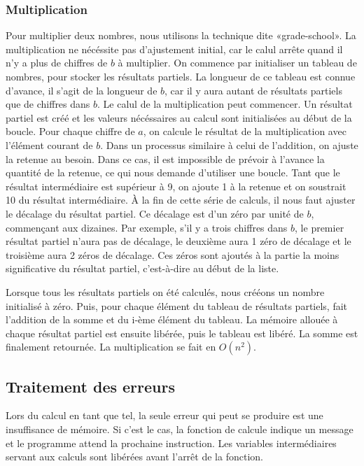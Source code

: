 \documentclass[letterpaper,12pt]{scrartcl}
\begin{document}
            \subsubsection{Multiplication}
             Pour multiplier deux nombres, nous utilisons la technique dite «grade-school». La multiplication ne nécéssite pas d'ajustement initial, car le calul arrête quand il n'y a plus de chiffres de $b$ à multiplier. On commence par initialiser un tableau de nombres, pour stocker les résultats partiels. La longueur de ce tableau est connue d'avance, il s'agit de la longueur de $b$, car il y aura autant de résultats partiels que de chiffres dans $b$. Le calul de la multiplication peut commencer. Un résultat partiel est créé et les valeurs nécéssaires au calcul sont initialisées au début de la boucle. Pour chaque chiffre de $a$, on calcule le résultat de la multiplication avec l'élément courant de $b$. Dans un processus similaire à celui de l'addition, on ajuste la retenue au besoin. Dans ce cas, il est impossible de prévoir à l'avance la quantité de la retenue, ce qui nous demande d'utiliser une boucle. Tant que le résultat intermédiaire est supérieur à 9, on ajoute 1 à la retenue et on soustrait 10 du résultat intermédiaire. À la fin de cette série de calculs, il nous faut ajuster le décalage du résultat partiel. Ce décalage est d'un zéro par unité de $b$, commençant aux dizaines. Par exemple, s'il y a trois chiffres dans $b$, le premier résultat partiel n'aura pas de décalage, le deuxième aura 1 zéro de décalage et le troisième aura 2 zéros de décalage. Ces zéros sont ajoutés à la partie la moins significative du résultat partiel, c'est-à-dire au début de la liste. 

             Lorsque tous les résultats partiels on été calculés, nous crééons un nombre initialisé à zéro. Puis, pour chaque élément du tableau de résultats partiels, fait l'addition de la somme et du i-ème élément du tableau. La mémoire allouée à chaque résultat partiel est ensuite libérée, puis le tableau est libéré. La somme est finalement retournée. La multiplication se fait en $O(n^2)$.
            
        
        \subsection{Traitement des erreurs}
         Lors du calcul en tant que tel, la seule erreur qui peut se produire est une insuffisance de mémoire. Si c'est le cas, la fonction de calcule indique un message et le programme attend la prochaine instruction. Les variables intermédiaires servant aux calculs sont libérées avant l'arrêt de la fonction.
\end{document}
